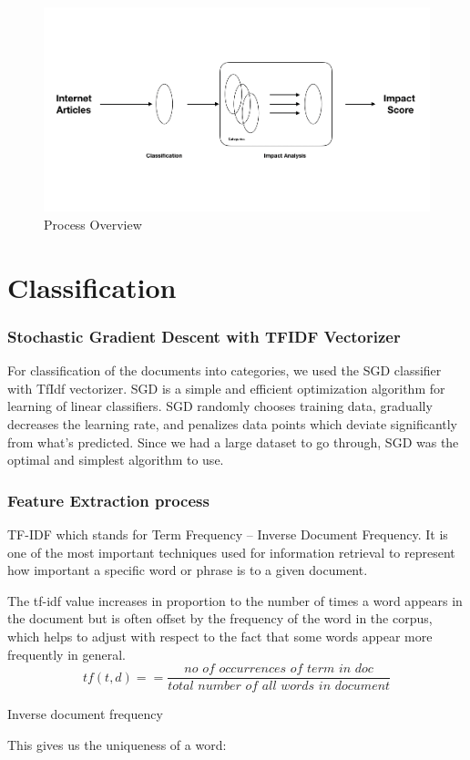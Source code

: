 \documentclass[paper=a4, fontsize=11pt]{scrartcl}
\numberwithin{equation}{section}		%
\numberwithin{figure}{section}			%
\numberwithin{table}{section}				%
\begin{document}
\begin{figure}
	\centering
 	 \includegraphics[width=0.6\linewidth]{impact_score.png}
	  \caption{Process Overview}
 	 \label{fig:Impact Potential}
\end{figure}
\section{Classification}
\subsubsection {Stochastic Gradient Descent with TFIDF Vectorizer}
For classification of the documents into categories, we used the SGD classifier with TfIdf vectorizer. SGD is a simple and efficient optimization algorithm for learning of linear classifiers.
SGD randomly chooses training data, gradually decreases the learning rate, and penalizes data points which deviate significantly from what's predicted. Since we had a large dataset to go through, SGD was the optimal and simplest algorithm to use.

\subsubsection{Feature Extraction process}
TF-IDF which stands for Term Frequency – Inverse Document Frequency. It is one of the most important techniques used for information retrieval to represent how important a specific word or phrase is to a given document.

The tf-idf value increases in proportion to the number of times a word appears in the document but is often offset by the frequency of the word in the corpus, which helps to adjust with respect to the fact that some words appear more frequently in general.
\[tf(t,d) =  = \frac{\textit{no of occurrences of term in doc} }{\textit{total number of all words in document}}\]
\item Inverse document frequency

 This gives us the uniqueness of a word:
\end{document}
